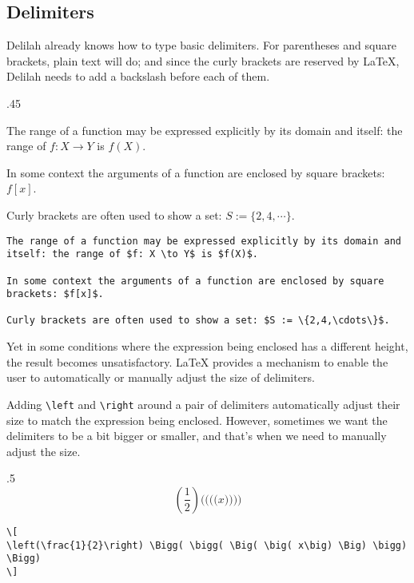 \subsection{Delimiters}
Delilah already knows how to type basic delimiters. For parentheses and square brackets, plain text will do; and since the curly brackets are reserved by \LaTeX{}, Delilah needs to add a backslash before each of them.
\begin{parexammar}{.45\textandmarginlen}{
The range of a function may be expressed explicitly by its domain and itself: the range of $f: X \to Y$ is $f(X)$.

In some context the arguments of a function are enclosed by square brackets: $f[x]$.

Curly brackets are often used to show a set: $S := \{2,4,\cdots\}$.
}
\begin{lstlisting}
The range of a function may be expressed explicitly by its domain and itself: the range of $f: X \to Y$ is $f(X)$.

In some context the arguments of a function are enclosed by square brackets: $f[x]$.

Curly brackets are often used to show a set: $S := \{2,4,\cdots\}$.
\end{lstlisting}
\end{parexammar}

Yet in some conditions where the expression being enclosed has a different height, the result becomes unsatisfactory. \LaTeX{} provides a mechanism to enable the user to automatically or manually adjust the size of delimiters.

Adding \verb=\left= and \verb=\right= around a pair of delimiters automatically adjust their size to match the expression being enclosed. However, sometimes we want the delimiters to be a bit bigger or smaller, and that's when we need to manually adjust the size.
\begin{parexammar}{.5\textandmarginlen}{
\[
\left( \frac{1}{2} \right) 
\Bigg( \bigg( \Big( \big( x\big) \Big) \bigg) \Bigg)
\]
}
\begin{lstlisting}
\[
\left(\frac{1}{2}\right) \Bigg( \bigg( \Big( \big( x\big) \Big) \bigg) \Bigg)
\]
\end{lstlisting}
\end{parexammar}

